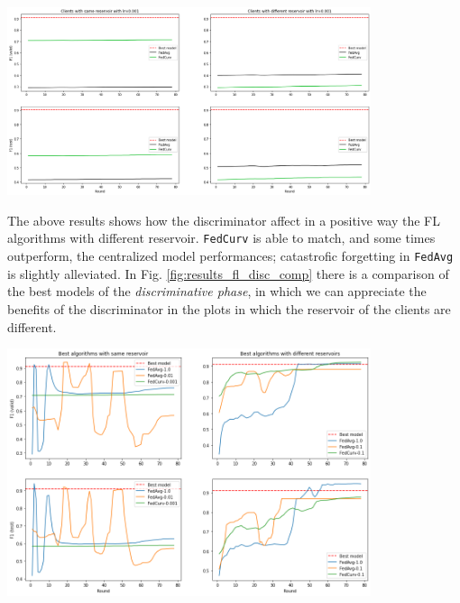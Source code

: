 {{{\begin{center}
\begin{minipage}[c]{\textwidth}
    \centering
    \includegraphics[width=0.8\textwidth]{contents/Chapter6/results_fl_disc_0001.png}
    \label{fig:results_fl_disc_0001}
\end{minipage}
\end{center}


The above results shows how the discriminator affect in a positive way the FL algorithms with different reservoir. \texttt{FedCurv} is able to match, and some times outperform, the centralized model performances; catastrofic forgetting in \texttt{FedAvg} is slightly alleviated. In Fig. \ref{fig:results_fl_disc_comp} there is a comparison of the best models of the \textit{discriminative phase}, in which we can appreciate the benefits of the discriminator in the plots in which the reservoir of the clients are different.

\begin{center}
\begin{minipage}[c]{\textwidth}
    \centering
    \includegraphics[width=0.8\textwidth]{contents/Chapter6/results_fl_disc_comp.png}
    \label{fig:results_fl_disc_comp}
\end{minipage}
\end{center}

}}}
